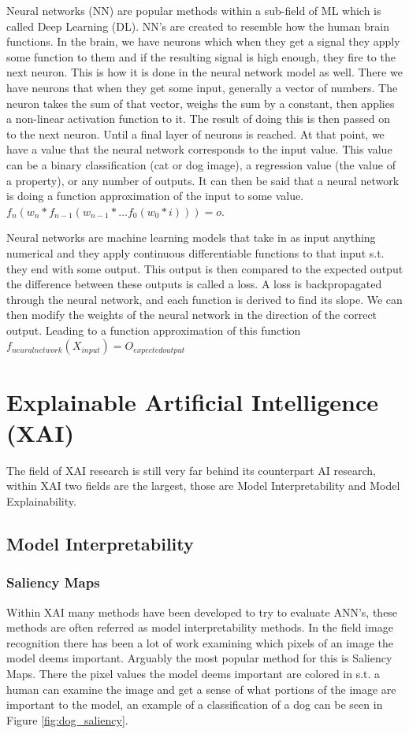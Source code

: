 Neural networks (NN) are popular methods within a sub-field of ML which is called Deep Learning (DL).
NN's are created to resemble how the human brain functions. In the brain, we have neurons which when they get a signal they apply some function to them and if the resulting signal is high enough, they fire to the next neuron. This is how it is done in the neural network model as well.
There we have neurons that when they get some input, generally a vector of numbers. The neuron takes the sum of that vector, weighs the sum by a constant, then applies a non-linear activation function to it. The result of doing this is then passed on to the next neuron. Until a final layer of neurons is reached. At that point, we have a value that the neural network corresponds to the input value. This value can be a binary classification (cat or dog image), a regression value (the value of a property), or any number of outputs. It can then be said that a neural network is doing a function approximation of the input to some value. $f_n ( w_n * f_{n-1} (w_{n-1} * \dots f_0(w_0*i))) = o$.

Neural networks are machine learning models that take in as input anything numerical and they apply continuous differentiable functions to that input s.t. they end with some output. This output is then compared to the expected output the difference between these outputs is called a loss. A loss is backpropagated through the neural network, and each function is derived to find its slope. We can then modify the weights of the neural network in the direction of the correct output. Leading to a function approximation of this function $f_{neuralnetwork}(X_{input}) = O_{expectedoutput}$

\section{Explainable Artificial Intelligence (XAI)}

The field of XAI research is still very far behind its counterpart AI research, within XAI two fields are the largest, those are Model Interpretability and Model Explainability.

\subsection{Model Interpretability}

\subsubsection{Saliency Maps}
Within XAI many methods have been developed to try to evaluate
ANN's, these methods are often referred as model interpretability methods.
In the field image recognition there has been a lot of work examining which
pixels of an image the model deems important. Arguably the most popular
method for this is Saliency Maps\cite{Koch:saliency}. There the pixel values the model
deems important are colored in s.t. a human can examine the image and get a
sense of what portions of the image are important to the model, an example of
a classification of a dog can be seen in Figure \ref{fig:dog_saliency}.

